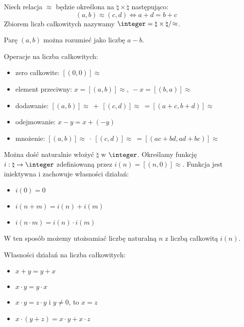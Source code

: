 \begin{definition}
    Niech relacja \( \approx \) będzie określona na \( \natural \times \natural \) następująco:
    \[
        (a, b) \approx (c, d) \iff a + d = b + c
    \]
    Zbiorem liczb całkowitych nazywamy \( \integer = \natural \times \natural /\!\approx \).
\end{definition}
Parę \( (a, b) \) można rozumieć jako liczbę \( a - b \).

Operacje na liczba całkowitych:
\begin{itemize}
    \item zero całkowite: \( [(0, 0)]\!\approx \)
    \item element przeciwny: \( x = [(a, b)]\!\approx, \ -x = [(b, a)]\!\approx \)
    \item dodawanie: \( [(a, b)]\!\approx \: + \: [(c, d)]\!\approx \: = [(a + c, b + d)]\!\approx \)
    \item odejmowanie: \( x - y = x + (-y) \)
    \item mnożenie: \( [(a, b)]\!\approx \: \cdot \: [(c, d)]\!\approx \: = [(ac + bd, ad + bc)]\!\approx \)
\end{itemize}

Można dość naturalnie włożyć \( \natural \) w \( \integer \). Określamy funkcję \( i : \natural \rightarrow \integer \) zdefiniowaną przez \( i(n) = [(n, 0)]\!\approx \).
Funkcja jest iniektywna i zachowuje własności działań:
\begin{itemize}
    \item \( i(0) = 0 \)
    \item \( i(n + m) = i(n) + i(m) \)
    \item \( i(n \cdot m) = i(n) \cdot i(m) \)
\end{itemize}
W ten sposób możemy utożsamiać liczbę naturalną \( n \) z liczbą całkowitą \( i(n) \).

Własności działań na liczba całkowitych:
\begin{itemize}
    \item \( x + y = y + x \)
    \item \( x \cdot y = y \cdot x \)
    \item \( x \cdot y = z \cdot y \) i \( y \ne 0 \), to \( x = z \)
    \item \( x \cdot (y + z) = x \cdot y + x \cdot z \)
\end{itemize}
